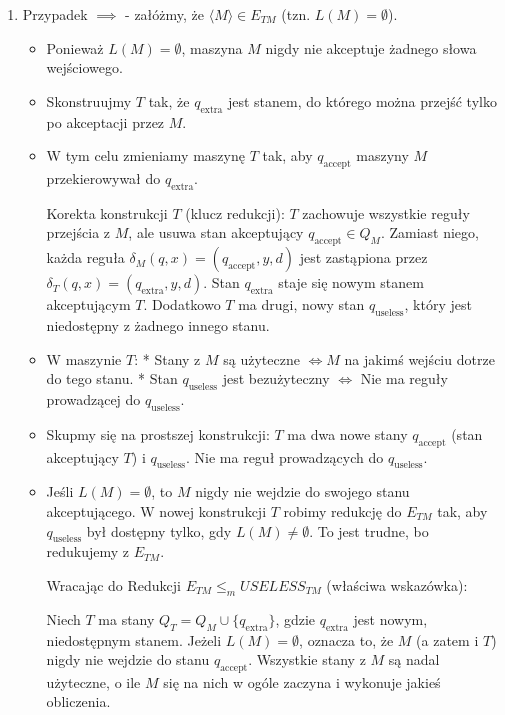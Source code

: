 \documentclass{article}
\begin{document}
\begin{enumerate}
    \item Przypadek $\implies$ - załóżmy, że $\langle M \rangle \in E_{TM}$ (tzn. $L(M) = \emptyset$).
    \begin{itemize}
        \item Ponieważ $L(M) = \emptyset$, maszyna $M$ nigdy nie akceptuje żadnego słowa wejściowego.
        \item Skonstruujmy $T$ tak, że $q_{\mathrm{extra}}$ jest stanem, do którego można przejść tylko po akceptacji przez $M$.
        \item W tym celu zmieniamy maszynę $T$ tak, aby $q_{\mathrm{accept}}$ maszyny $M$ przekierowywał do $q_{\mathrm{extra}}$.

        Korekta konstrukcji $T$ (klucz redukcji):
        $T$ zachowuje wszystkie reguły przejścia z $M$, ale usuwa stan akceptujący $q_{\mathrm{accept}} \in Q_M$. Zamiast niego, każda reguła $\delta_M(q, x) = (q_{\mathrm{accept}}, y, d)$ jest zastąpiona przez $\delta_T(q, x) = (q_{\mathrm{extra}}, y, d)$. Stan $q_{\mathrm{extra}}$ staje się nowym stanem akceptującym $T$. Dodatkowo $T$ ma drugi, nowy stan $q_{\mathrm{useless}}$, który jest niedostępny z żadnego innego stanu.

        \item W maszynie $T$:
            * Stany z $M$ są użyteczne $\iff M$ na jakimś wejściu dotrze do tego stanu.
            * Stan $q_{\mathrm{useless}}$ jest bezużyteczny $\iff$ Nie ma reguły prowadzącej do $q_{\mathrm{useless}}$.

        \item Skupmy się na prostszej konstrukcji: $T$ ma dwa nowe stany $q_{\mathrm{accept}}$ (stan akceptujący $T$) i $q_{\mathrm{useless}}$. Nie ma reguł prowadzących do $q_{\mathrm{useless}}$.

        \item Jeśli $L(M) = \emptyset$, to $M$ nigdy nie wejdzie do swojego stanu akceptującego. W nowej konstrukcji $T$ robimy redukcję do $E_{TM}$ tak, aby $q_{\mathrm{useless}}$ był dostępny tylko, gdy $L(M) \neq \emptyset$. To jest trudne, bo redukujemy z $E_{TM}$.

        Wracając do Redukcji $E_{TM} \le_m USELESS_{TM}$ (właściwa wskazówka):

        Niech $T$ ma stany $Q_T = Q_M \cup \{q_{\mathrm{extra}}\}$, gdzie $q_{\mathrm{extra}}$ jest nowym, niedostępnym stanem.
        Jeżeli $L(M) = \emptyset$, oznacza to, że $M$ (a zatem i $T$) nigdy nie wejdzie do stanu $q_{\mathrm{accept}}$. Wszystkie stany z $M$ są nadal użyteczne, o ile $M$ się na nich w ogóle zaczyna i wykonuje jakieś obliczenia.


\end{itemize}
\end{enumerate}
\end{document}
